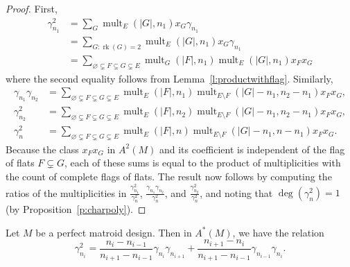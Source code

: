 \documentclass[ALCO,published]{cedram}
\numberwithin{equation}{section}
\numberwithin{figure}{section}
\DeclareMathOperator{\mult}{mult}
\DeclareMathOperator{\rk}{rk}
\begin{document}
\begin{proof}
    First,
    \begin{align*}
    \gamma_{n_1}^2&=\sum_G \mult_{E}(|G|,n_1) x_G\gamma_{n_1}\\
    &=\sum_{G\colon \rk(G)=2} \mult_{E}(|G|,n_1) x_G\gamma_{n_1}\\
    &=\sum_{\varnothing\subsetneq F\subsetneq G\subsetneq E}\mult_{G}(|F|,n_1) \mult_{E}(|G|,n_1)x_Fx_G
    \end{align*}
    where the second equality follows from Lemma~\ref{l:productwithflag}.
    Similarly,
    \begin{align*}
      \gamma_{n_1}\gamma_{n_2}&=\sum_{\varnothing\subsetneq F\subsetneq G\subsetneq E} \mult_{E}(|F|,n_1)\mult_{E\setminus F}(|G|-n_1,n_2-n_1)x_Fx_G,\\
      \gamma_{n_2}^2&=\sum_{\varnothing\subsetneq F\subsetneq G\subsetneq E} \mult_{E}(|F|,n_2)\mult_{E
      \setminus F}(|G|-n_1,n_2-n_1)x_Fx_G,\\
      \gamma_n^2&=\sum_{\varnothing\subsetneq F\subsetneq G\subsetneq E} \mult_{E}(|F|,n)\mult_{E\setminus F}(|G|-n_1,n-n_1)x_Fx_G.
    \end{align*}
    Because the class $x_Fx_G$ in $A^2(M)$ and its coefficient is independent of the flag of flats $F\subsetneq G$, each of these sums is equal to the product of multiplicities with the count of complete flags of flats.
    The result now follows by computing the ratios of the multiplicities in $\frac{\gamma_{n_1}^2}{\gamma_n^2}$, $\frac{\gamma_{n_1}\gamma_{n_2}}{\gamma_n^2}$, and $\frac{\gamma_{n_2}^2}{\gamma_n^2}$,
    and noting that $\deg(\gamma_n^2)=1$ (by Proposition~\ref{p:charpoly}). %
\end{proof}

\begin{lemma} \label{l:perfectrecurrence}
  Let $M$ be a perfect matroid design. Then in $A^*(M)$, we have the relation
  \[\gamma_{n_i}^2=\frac{n_i-n_{i-1}}{n_{i+1}-n_{i-1}}\gamma_{n_i}\gamma_{n_{i+1}}
  +\frac{n_{i+1}-n_i}{n_{i+1}-n_{i-1}}\gamma_{n_{i-1}}\gamma_{n_{i}}.
  \]
\end{lemma}
\end{document}
